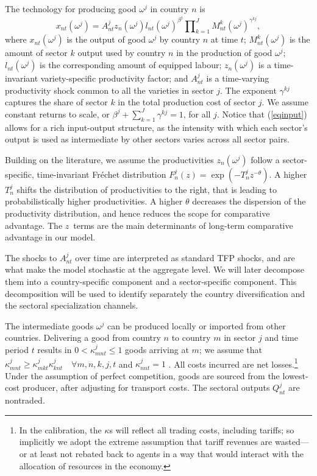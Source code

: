 \documentclass[12pt]{article}
\begin{document}
The technology for producing good $\omega ^{j}$ in country $n$ is 
\begin{equation}
x_{nt}(\omega ^{j})=A_{nt}^{j}z_{n}(\omega ^{j})l_{nt}(\omega ^{j})^{\beta
^{j}}\prod\nolimits_{k=1}^{J}M_{nt}^{k}(\omega ^{j})^{\gamma ^{kj}},
\label{eqinput}
\end{equation}%
where $x_{nt}(\omega ^{j})$ is the output of good $\omega ^{j}$ by country $%
n $ at time $t$; $M_{nt}^{k}(\omega ^{j})$ is the amount of sector $k$
output used by country $n$ in the production of good $\omega ^{j};$ $%
l_{nt}(\omega ^{j})$ is the corresponding amount of equipped labour; $%
z_{n}(\omega ^{j})$ is a time-invariant variety-specific productivity
factor; and $A_{nt}^{j}$ is a time-varying productivity shock common to all
the varieties in sector $j $. The exponent $\gamma ^{kj}$ captures the share
of sector $k$ in the total production cost of sector $j.$ We assume constant
returns to scale, or $\beta ^{j}+\sum_{k=1}^{J}\gamma ^{kj}=1$, for all $j$.
Notice that (\ref{eqinput}) allows for a rich input-output structure, as the
intensity with which each sector's output is used as intermediate by other
sectors varies across all sector pairs.

Building on the literature, we assume the productivities $z_{n}(\omega ^{j})$
follow a sector-specific, time-invariant Fr\'{e}chet distribution $%
F_{n}^{j}(z)=\exp (-T_{n}^{j}z^{-\theta })$. A higher $T_{n}^{j}$ shifts the
distribution of productivities to the right, that is leading to
probabilistically higher productivities. A higher $\theta $ decreases the
dispersion of the productivity distribution, and hence reduces the scope for
comparative advantage. The $z$\ terms are the main determinants of long-term
comparative advantage in our model.

The shocks to $A_{nt}^{j}$ over time are interpreted as standard TFP shocks,
and are what make the model stochastic at the aggregate level. We will later
decompose them into a country-specific component and a sector-specific
component. This decomposition will be used to identify separately the
country diversification and the sectoral specialization channels.

The intermediate goods $\omega ^{j}$ can be produced locally or imported
from other countries. Delivering a good from country $n$ to country $m$ in
sector $j$ and time period $t$ results in $0<\kappa _{mnt}^{j}\leq 1$ goods
arriving at $m$; we assume that $\kappa _{mnt}^{j}\geq \kappa
_{mkt}^{j}\kappa _{knt}^{j}\quad \forall m,n,k,j,t$ and $\kappa _{nnt}^{j}=1$%
. All costs incurred are net losses.\footnote{%
In the calibration, the $\kappa $s will reflect all trading costs, including
tariffs; so implicitly we adopt the extreme assumption that tariff revenues
are wasted---or at least not rebated back to agents in a way that would
interact with the allocation of resources in the economy.} Under the
assumption of perfect competition, goods are sourced from the lowest-cost
producer, after adjusting for transport costs. The sectoral outputs $%
Q_{nt}^{j}$ are nontraded.
\end{document}
